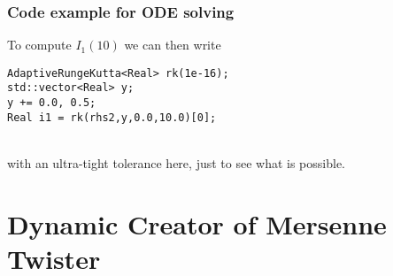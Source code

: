\documentclass{beamer}
\begin{document}
\begin{frame}[fragile]
\frametitle{Code example for ODE solving}
To compute $I_1(10)$ we can then write
\vspace{2mm}
\begin{verbatim}
AdaptiveRungeKutta<Real> rk(1e-16);
std::vector<Real> y;
y += 0.0, 0.5;
Real i1 = rk(rhs2,y,0.0,10.0)[0];
\end{verbatim}
\\
\vspace{2mm}
with an ultra-tight tolerance here, just to see what is possible.
\end{frame}






\section{Dynamic Creator of Mersenne Twister}
\end{document}
